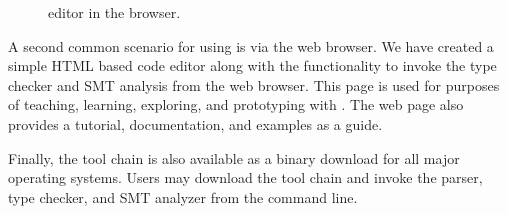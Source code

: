 \begin{figure}
\centering
{}
\caption{\Klang{} editor in the browser.}
\label{fig:k}
\end{figure}

A second common scenario for using \Klang{} is via the web browser. We
have created a simple HTML based \Klang{} code editor along with the
functionality to invoke the type checker and SMT analysis from the web
browser. This page is used for purposes of teaching, learning,
exploring, and prototyping with \Klang{}. The web page also provides a
tutorial, documentation, and \Klang{} examples as a guide. 

Finally, the \Klang{} tool chain is also available as a binary
download for all major operating systems. Users may download the tool
chain and invoke the \Klang{} parser, type checker, and SMT analyzer
from the command line.

